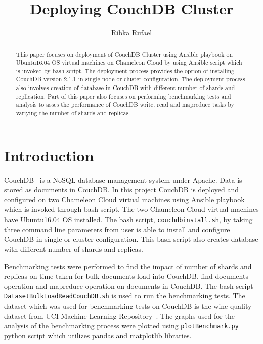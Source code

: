 
\title{Deploying CouchDB Cluster}


\author{Ribka Rufael}
\orcid{}



\renewcommand{\shortauthors}{R. Rufael}


\begin{abstract}
  This paper focuses on deployment of CouchDB Cluster using Ansible
  playbook on Ubuntu16.04 OS virtual machines on Chameleon Cloud by
  using Ansible script which is invoked by bash script. The deployment
  process provides the option of installing CouchDB version 2.1.1 in single node or
  cluster configuration. The deployment process also involves creation
  of database in CouchDB with different number of shards and replication. Part of this paper
  also focuses on performing  benchmarking tests and analysis to asses the
  performance of CouchDB write, read and mapreduce tasks by variying
  the number of shards and replicas. 
\end{abstract}



\maketitle

\section{Introduction}

CouchDB~\cite{www-Couchdb} is a NoSQL database management system
under Apache. Data is stored as documents in CouchDB. In this project
CouchDB is deployed and configured on two Chameleon Cloud virtual machines using
Ansible playbook which is invoked through bash script. The two Chameleon
Cloud virtual machines have Ubuntu16.04 OS installed. The bash script, 
\verb|couchdbinstall.sh|, by taking three command line parameters from user is
able to install and configure CouchDB in single or cluster
configuration.  This bash script also creates database with different
number of shards and replicas. 

Benchmarking tests were performed to find the
impact of number of shards and replicas on time taken for bulk
documents load into CouchDB, find documents operation and mapreduce
operation on documents in CouchDB. The bash script \verb|DatasetBulkLoadReadCouchDB.sh| is used to run the
benchmarking tests.  The dataset which
was used for benchmarking tests on CouchDB is the wine quality dataset
from UCI Machine Learning Repository~\cite{www-WineQuality}. The
graphs used for the analysis of the benchmarking process were plotted
using \verb|plotBenchmark.py| python script which utilizes pandas and
matplotlib libraries.

